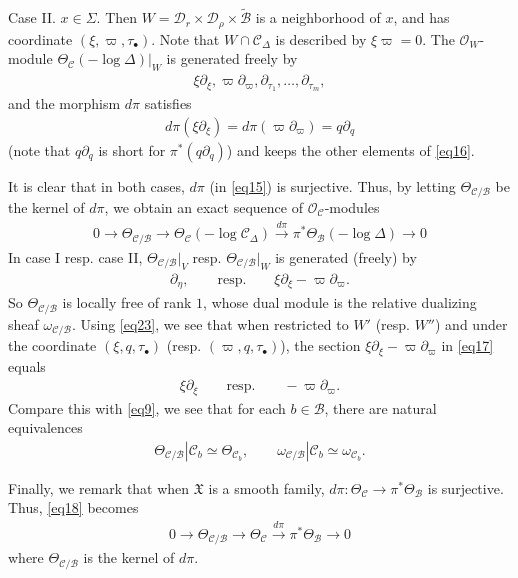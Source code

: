 \documentclass[11pt,b5paper,notitlepage]{article}
\theoremstyle{definition}
\theoremstyle{plain}
\newcommand{\fk}{\mathfrak}
\newcommand{\mc}{\mathcal}
\newcommand{\wtd}{\widetilde}
\newcommand{\scr}{\mathscr}
\newcommand{\blt}{\bullet}
\numberwithin{equation}{section}
\begin{document}
Case II. $x\in\Sigma$.  Then $W=\mc D_r\times\mc D_\rho\times\wtd{\mc B}$ is a neighborhood of $x$, and has coordinate $(\xi,\varpi,\tau_\blt)$. Note that $W\cap\mc C_\Delta$ is described by $\xi\varpi=0$. The  $\scr O_W$-module $\Theta_{\mc C}(-\log\Delta)|_W$ is generated freely by
\begin{align}
\xi\partial_\xi,\varpi\partial_\varpi,\partial_{\tau_1},\dots,\partial_{\tau_m},\label{eq16}
\end{align} 
and the morphism $d\pi$ satisfies
\begin{align}
d\pi(\xi\partial_\xi)=d\pi(\varpi\partial_\varpi)=q\partial_q\label{eq81}
\end{align}
(note that $q\partial_q$ is short for $\pi^*(q\partial_q)$) and keeps the other elements of \eqref{eq16}.

It is clear that in both cases, $d\pi$ (in \eqref{eq15}) is surjective. Thus, by letting $\Theta_{\mc C/\mc B}$ \index{zz@$\Theta_{\mc C/\mc B}$} be the kernel of $d\pi$, we obtain an exact sequence of  $\scr O_{\mc C}$-modules
\begin{align}
\boxed{~~0\rightarrow \Theta_{\mc C/\mc B}\rightarrow \Theta_{\mc C}(-\log \mc C_\Delta)\xrightarrow{d\pi}\pi^*\Theta_{\mc B}(-\log \Delta)\rightarrow 0~~}\label{eq18}
\end{align}
In case I resp. case II, $\Theta_{\mc C/\mc B}|_V$ resp. $\Theta_{\mc C/\mc B}|_W$  is generated (freely) by
\begin{align}
\partial_\eta,\qquad\text{resp.}\qquad \xi\partial_\xi-\varpi\partial_\varpi.\label{eq17}
\end{align}
So $\Theta_{\mc C/\mc B}$ is locally free of rank $1$, whose dual module is the relative dualizing sheaf \index{zz@$\omega_{\mc C/\mc B}$} $\omega_{\mc C/\mc B}$. Using \eqref{eq23}, we see that when restricted to $W'$ (resp. $W''$) and under the coordinate $(\xi,q,\tau_\blt)$ (resp. $(\varpi,q,\tau_\blt)$), the section $\xi\partial_\xi-\varpi\partial_\varpi$ in \eqref{eq17} equals
\begin{align}
\xi\partial_\xi\qquad\text{resp.}\qquad -\varpi\partial_\varpi.\label{eq24}
\end{align}
Compare this with \eqref{eq9}, we see that for each $b\in\mc B$, there are natural equivalences
\begin{align*}
\Theta_{\mc C/\mc B}|\mc C_b\simeq\Theta_{\mc C_b},\qquad \omega_{\mc C/\mc B}|\mc C_b\simeq\omega_{\mc C_b}.
\end{align*}

Finally, we remark that when $\fk X$ is a smooth family, $d\pi:\Theta_{\mc C}\rightarrow\pi^*\Theta_{\mc B}$ is surjective. Thus, \eqref{eq18} becomes
\begin{align*}
0\rightarrow \Theta_{\mc C/\mc B}\rightarrow \Theta_{\mc C}\xrightarrow{d\pi}\pi^*\Theta_{\mc B}\rightarrow 0
\end{align*}
where $\Theta_{\mc C/\mc B}$ is the kernel of $d\pi$.
\end{document}

